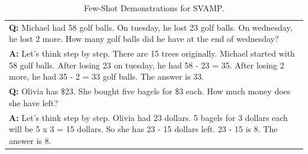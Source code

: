 \documentclass[11pt]{article}
\begin{document}
\begin{table}[ht]
\begin{tabularx}{\textwidth}{X}
    \hdashline
    \textbf{Q: }Michael had 58 golf balls. On tuesday, he lost 23 golf balls. On wednesday, he lost 2 more. How many golf balls did he have at the end of wednesday? \\
    \textbf{A: }Let's think step by step. There are 15 trees originally. Michael started with 58 golf balls. After losing 23 on tuesday, he had 58 - 23 = 35. After losing 2 more, he had 35 - 2 = 33 golf balls. The answer is 33.\\
    \hdashline
    \textbf{Q: }Olivia has \$23. She bought five bagels for \$3 each. How much money does she have left? \\
    \textbf{A: }Let's think step by step. Olivia had 23 dollars. 5 bagels for 3 dollars each will be 5 x 3 = 15 dollars. So she has 23 - 15 dollars left. 23 - 15 is 8. The answer is 8.\\
    \bottomrule
    \end{tabularx}
    \caption{Few-Shot Demonstrations for SVAMP.}
    \label{tab:fs_svamp}
\end{table}
\end{document}
